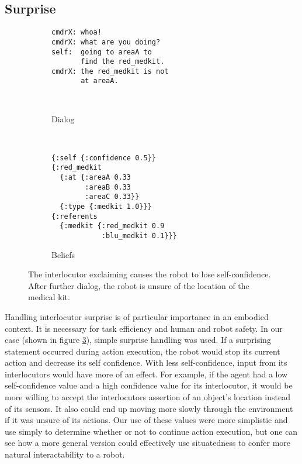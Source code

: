 \documentclass[12pt]{article}
\begin{document}
\subsection{Surprise}
\begin{figure}[h]
  \centering
  \begin{subfigure}[t]{0.4\textwidth}
    \centering
\begin{verbatim}
cmdrX: whoa!
cmdrX: what are you doing?
self:  going to areaA to
       find the red_medkit.
cmdrX: the red_medkit is not
       at areaA.



\end{verbatim}
    \label{fig:surprise_text}
    \caption{Dialog}
  \end{subfigure}
  ~\qquad\qquad
  \begin{subfigure}[t]{0.4\textwidth}
    \centering
\begin{verbatim}
{:self {:confidence 0.5}}
{:red_medkit
  {:at {:areaA 0.33
        :areaB 0.33
        :areaC 0.33}}
  {:type {:medkit 1.0}}}
{:referents
  {:medkit {:red_medkit 0.9 
            :blu_medkit 0.1}}}
\end{verbatim}
    \label{fig:surprise_beliefs}
    \caption{Beliefs}
  \end{subfigure}
  \caption{The interlocutor exclaiming causes the robot to lose
    self-confidence. After further dialog, the robot is unsure of the
    location of the medical kit.}
  \label{fig:surprise}
\end{figure}

Handling interlocutor surprise is of particular importance in an
embodied context. It is necessary for task efficiency and human and
robot safety. In our case (shown in figure \ref{fig:surprise}), simple
surprise handling was used. If a surprising statement occurred during
action execution, the robot would stop its current action and decrease
its self confidence. With less self-confidence, input from its
interlocutors would have more of an effect. For example, if the agent
had a low self-confidence value and a high confidence value for its
interlocutor, it would be more willing to accept the interlocutors
assertion of an object's location instead of its sensors. It also
could end up moving more slowly through the environment if it was
unsure of its actions. Our use of these values were more simplistic
and use simply to determine whether or not to continue action
execution, but one can see how a more general version could
effectively use situatedness to confer more natural interactability to
a robot.
\end{document}
